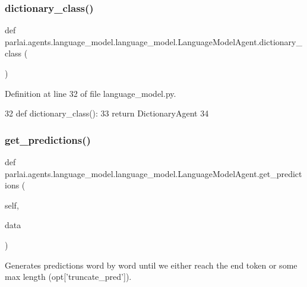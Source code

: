 \subsubsection{\texorpdfstring{dictionary\+\_\+class()}{dictionary\_class()}}
{\footnotesize\ttfamily def parlai.\+agents.\+language\+\_\+model.\+language\+\_\+model.\+Language\+Model\+Agent.\+dictionary\+\_\+class (\begin{DoxyParamCaption}{ }\end{DoxyParamCaption})\hspace{0.3cm}{\ttfamily [static]}}



Definition at line 32 of file language\+\_\+model.\+py.


\begin{DoxyCode}
32     \textcolor{keyword}{def }dictionary\_class():
33         \textcolor{keywordflow}{return} DictionaryAgent
34 
\end{DoxyCode}
\mbox{\label{classparlai_1_1agents_1_1language__model_1_1language__model_1_1LanguageModelAgent_aa3de87163cd61e4195afc0ccf801699b}} 
\subsubsection{\texorpdfstring{get\+\_\+predictions()}{get\_predictions()}}
{\footnotesize\ttfamily def parlai.\+agents.\+language\+\_\+model.\+language\+\_\+model.\+Language\+Model\+Agent.\+get\+\_\+predictions (\begin{DoxyParamCaption}\item[{}]{self,  }\item[{}]{data }\end{DoxyParamCaption})}

\begin{DoxyVerb}Generates predictions word by word until we either reach the end token or some
max length (opt['truncate_pred']).
\end{DoxyVerb}
 

